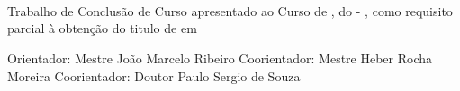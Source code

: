 %
%
\makeatletter
\begin{folhaderosto}
    \thispagestyle{empty}
    
    \begin{center}
		\large\textbf{\expandafter\uppercase\expandafter{\imprimirnomeautor}}{}
		\large\textbf{\expandafter\uppercase\expandafter{\imprimirsobrenomeautor}}\\
		\vspace*{5.0 cm}
		\normalsize\textbf{\expandafter\uppercase\expandafter{\imprimirtitulotb}}\\
		\text{\expandafter\expandafter{\imprimirsubtitulo}}\\
		
    \end{center}
	
	\vspace*{4.0 cm}
    \large
	\hfill
	\begin{minipage}{8 cm}
		\begin{small}
		\setlength{\baselineskip}{0.7\baselineskip}
    	Trabalho de Conclusão de Curso apresentado ao Curso de {\imprimirprograma}, do {\imprimirinstituicao} - 
    	{\imprimirdepartamento}, como requisito parcial à obtenção do titulo de {\imprimirgrau} em {\imprimirprograma}
    	
    	\vspace*{0.6 cm}
    	Orientador: Mestre João Marcelo Ribeiro
    	\newline
    	Coorientador: Mestre Heber Rocha Moreira
		\newline
    	Coorientador: Doutor Paulo Sergio de Souza
    	
		\end{small}
    \end{minipage}
    
    \begin{center}
        \vspace*{\fill}
        \small\textbf{\expandafter\uppercase\expandafter{\imprimirlocal}}\\
	    \small\textbf{\expandafter\uppercase\expandafter{\imprimirdata}}\\
    \end{center}
    
\end{folhaderosto}
\makeatother